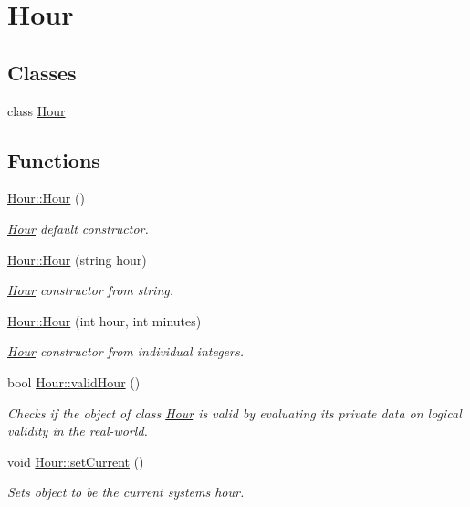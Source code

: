 \hypertarget{group___hour}{}\section{Hour}
\label{group___hour}
\subsection*{Classes}
\begin{DoxyCompactItemize}
\item 
class \hyperlink{class_hour}{Hour}
\end{DoxyCompactItemize}
\subsection*{Functions}
\begin{DoxyCompactItemize}
\item 
\mbox{\label{group___hour_ga57b604e71195671d96ef6b8e7b819a71}} 
\hyperlink{group___hour_ga57b604e71195671d96ef6b8e7b819a71}{Hour\+::\+Hour} ()
\begin{DoxyCompactList}\small\item\em \hyperlink{class_hour}{Hour} default constructor. \end{DoxyCompactList}\item 
\hyperlink{group___hour_ga77024d0dee349bc56162428af7c60f8c}{Hour\+::\+Hour} (string hour)
\begin{DoxyCompactList}\small\item\em \hyperlink{class_hour}{Hour} constructor from string. \end{DoxyCompactList}\item 
\hyperlink{group___hour_gaedd062589c21da403d9490a9706c3005}{Hour\+::\+Hour} (int hour, int minutes)
\begin{DoxyCompactList}\small\item\em \hyperlink{class_hour}{Hour} constructor from individual integers. \end{DoxyCompactList}\item 
bool \hyperlink{group___hour_ga1643bbcd2a1b14cd49f45955c62e8ce1}{Hour\+::valid\+Hour} ()
\begin{DoxyCompactList}\small\item\em Checks if the object of class \hyperlink{class_hour}{Hour} is valid by evaluating it\textquotesingle{}s private data on logical validity in the real-\/world. \end{DoxyCompactList}\item 
\mbox{\label{group___hour_ga641c0cf6dd5156a61d5f7f829891b42f}} 
void \hyperlink{group___hour_ga641c0cf6dd5156a61d5f7f829891b42f}{Hour\+::set\+Current} ()
\begin{DoxyCompactList}\small\item\em Sets object to be the current system\textquotesingle{}s hour. \end{DoxyCompactList}\end{DoxyCompactItemize}
